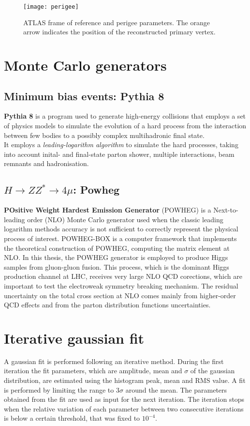 \documentclass[a4paper,twoside,12pt]{book}
\begin{document}
\begin{appendices}
\begin{figure}
\centering
\texttt{[image: perigee]}
\caption{ATLAS frame of reference and perigee parameters. The orange arrow indicates the position of the reconstructed primary vertex.}
\label{fig:appendix:perigee}
\end{figure}

\chapter{Monte Carlo generators}\label{appendix:MC}
\section{Minimum bias events: Pythia 8}
\textbf{Pythia 8} is a program used to generate high-energy collisions that employs a set of physics
models to simulate the evolution of a hard process from the interaction between few bodies 
to a possibly complex multihadronic final state\cite{Pythia8}. 	\\
It employs a \textit{leading-logarithm algorithm} to simulate the hard processes, 
taking into account inital- and final-state parton shower, multiple interactions, beam remnants
and hadronisation. 

\section{$H \rightarrow ZZ^* \rightarrow 4\mu$: Powheg}
\textbf{POsitive Weight Hardest Emission Generator} (POWHEG) is a Next-to-leading order (NLO) Monte Carlo generator
used when the classic leading logarithm methods accuracy is not sufficient to correctly 
represent the physical process of interest. POWHEG-BOX is a computer framework 
that implements the theoretical construction of POWHEG, computing the matrix element 
at NLO\cite{Powheg}. In this thesis, the POWHEG generator is employed to produce
Higgs samples from gluon-gluon fusion. This process, which is the dominant Higgs production 
channel at LHC, receives very large NLO QCD corections, which are important to test the 
electroweak symmetry breaking mechanism\cite{Powheg_ggH}. The residual uncertainty 
on the total cross section 
at NLO comes mainly from higher-order QCD effects and from the parton distribution
functions uncertainties.

\chapter{Iterative gaussian fit}\label{appendix:gaussFit}
A gaussian fit is performed following an iterative method. During the first
iteration the fit parameters, which are amplitude, mean and $\sigma$ of the gaussian
distribution, are estimated using 
the histogram peak, mean and RMS value. A fit is performed by limiting the range
to 3$\sigma$ around the mean. The parameters obtained from the fit are used as 
input for the next iteration. The iteration stops when the relative variation of each parameter between 
two consecutive iterations  is below a certain threshold, that was
fixed to $10^{-4}$.




\clearpage
\end{appendices}
\end{document}

